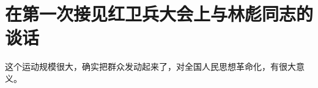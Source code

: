 \section[在第一次接见红卫兵大会上与林彪同志的谈话（一九六六年八月十八日）]{在第一次接见红卫兵大会上与林彪同志的谈话}


这个运动规模很大，确实把群众发动起来了，对全国人民思想革命化，有很大意义。


